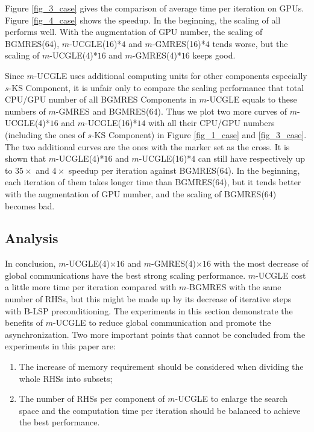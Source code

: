 Figure \ref{fig_3_case} gives the comparison of average time per iteration on GPUs. Figure \ref{fig_4_case} shows the speedup. In the beginning, the scaling of all performs well. With the augmentation of GPU number, the scaling of BGMRES(64), $m$-UCGLE(16)*$4$ and $m$-GMRES(16)*$4$ tends worse, but the scaling of $m$-UCGLE(4)*$16$ and $m$-GMRES(4)*$16$ keeps good.

Since $m$-UCGLE uses additional computing units for other components especially $s$-KS Component, it is unfair only to compare the scaling performance that total CPU/GPU number of all BGMRES Components in $m$-UCGLE equals to these numbers of $m$-GMRES and BGMRES(64). Thus we plot two more curves of $m$-UCGLE(4)*$16$ and $m$-UCGLE(16)*$14$ with all their CPU/GPU numbers (including the ones of $s$-KS Component) in Figure \ref{fig_1_case} and \ref{fig_3_case}. The two additional curves are the ones with the marker set as the cross. It is shown that $m$-UCGLE(4)*$16$ and $m$-UCGLE(16)*$4$ can still have respectively up to $35\times$ and $4 \times$ speedup per iteration against BGMRES(64). In the beginning, each iteration of them takes longer time than BGMRES(64), but it tends better with the augmentation of GPU number, and the scaling of BGMRES(64) becomes bad. 


\subsection{Analysis}

In conclusion, $m$-UCGLE(4)$\times 16$ and $m$-GMRES(4)$\times 16$ with the most decrease of global communications have the best strong scaling performance. $m$-UCGLE cost a little more time per iteration compared with $m$-BGMRES with the same number of RHSs, but this might be made up by its decrease of iterative steps with B-LSP preconditioning. The experiments in this section demonstrate the benefits of $m$-UCGLE to reduce global communication and promote the asynchronization. Two more important points that cannot be concluded from the experiments in this paper are: 

\begin{enumerate}
	\item The increase of memory requirement should be considered when dividing the whole RHSs into subsets;
	\item The number of RHSs per component of $m$-UCGLE to enlarge the search space and the computation time per iteration should be balanced to achieve the best performance.
\end{enumerate}

